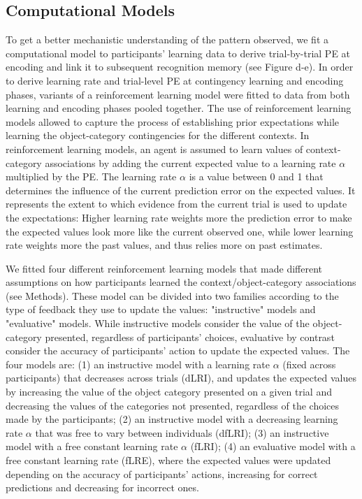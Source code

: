 \documentclass[a4paper,12pt]{article}
\begin{document}
\subsection{Computational Models}
To get a better mechanistic understanding of the pattern observed, we fit a computational model to participants' learning data to derive trial-by-trial PE at encoding and link it to subsequent recognition memory (see Figure \label{fig:Methods}d-e). 
In order to derive learning rate and trial-level PE at contingency learning and encoding phases, variants of a reinforcement learning model \citep{Sutton2018a} were fitted to data from both learning and encoding phases pooled together. The use of reinforcement learning models allowed to capture the process of establishing prior expectations while learning the object-category contingencies for the different contexts. In reinforcement learning models, an agent is assumed to learn values of context-category associations by adding the current expected value to a learning rate $\alpha$ multiplied by the PE. The learning rate $\alpha$ is a value between 0 and 1 that determines the influence of the current prediction error on the expected values. It represents the extent to which evidence from the current trial is used to update the expectations: Higher learning rate weights more the prediction error to make the expected values look more like the current observed one, while lower learning rate weights more the past values, and thus relies more on past estimates.  \par
We fitted four different reinforcement learning models that made different assumptions on how participants learned the context/object-category associations (see Methods). These model can be divided into two families according to the type of feedback they use to update the values: "instructive" models and "evaluative" models. While instructive models consider the value of the object-category presented, regardless of participants' choices, evaluative by contrast consider the accuracy of participants' action to update the expected values. The four models are: (1) an instructive model with a learning rate $\alpha$ (fixed across participants) that decreases across trials (dLRI), and updates the expected values by increasing the value of the object category presented on a given trial and decreasing the values of the categories not presented, regardless of the choices made by the participants; (2) an instructive model with a decreasing learning rate $\alpha$ that was free to vary between individuals (dfLRI); (3) an instructive model with a free constant learning rate $\alpha$ (fLRI); (4) an evaluative model with a free constant learning rate (fLRE), where the expected values were updated depending on the accuracy of participants' actions, increasing for correct predictions and decreasing for incorrect ones. \par
\end{document}
